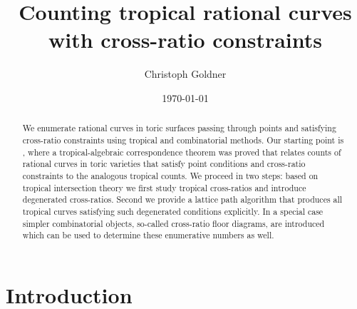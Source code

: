 \documentclass[11pt,reqno,a4]{amsart}
\theoremstyle{dotless}
\theoremstyle{definition}
\newcommand{\changelocaltocdepth}[1]{%
  \addtocontents{toc}{\protect\setcounter{tocdepth}{#1}}%
  \setcounter{tocdepth}{#1}%
}
\begin{document}
\setcounter{tocdepth}{0}



\author{Christoph Goldner}
\address{ Eberhard Karls Universit\"{a}t T\"{u}bingen, Germany}

\title{Counting tropical rational curves with cross-ratio constraints}



\date{\today}

\begin{abstract}
We enumerate rational curves in toric surfaces passing through points and satisfying cross-ratio constraints using tropical and combinatorial methods. Our starting point is \cite{IlyaCRC}, where a tropical-algebraic correspondence theorem was proved that relates counts of rational curves in toric varieties that satisfy point conditions and cross-ratio constraints to the analogous tropical counts. We proceed in two steps: based on tropical intersection theory we first study tropical cross-ratios and introduce degenerated cross-ratios. Second we provide a lattice path algorithm that produces all tropical curves satisfying such degenerated conditions explicitly. In a special case simpler combinatorial objects, so-called cross-ratio floor diagrams, are introduced which can be used to determine these enumerative numbers as well.
\end{abstract}

\maketitle

\tableofcontents

\changelocaltocdepth{1}
\section*{Introduction}
\end{document}
